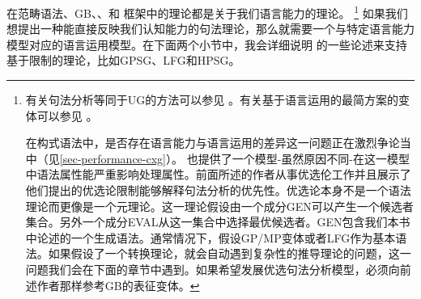 在范畴语法、GB\indexgbc、\lfgc、\gpsgc 和 \hpsgc 框架中的理论都是关于我们语言能力的理论。 \footnote{%
有关句法分析等同于UG的方法可以参见 。有关基于语言运用的最简方案的变体可以参见 。

在构式语法\indexcxgc 中，是否存在语言能力与语言运用的差异这一问题正在激烈争论当中（见\ref{sec-performance-cxg}）。 \citet*{FSCK99a}也提供了一个模型-虽然原因不同-在这一模型中语法属性能严重影响处理属性。前面所述的作者从事优选伦工作并且展示了他们提出的优选论限制能够解释句法分析的优先性。优选论\indexotc 本身不是一个语法理论而更像是一个元理论。这一理论假设由一个成分GEN可以产生一个候选者集合。另外一个成分EVAL从这一集合中选择最优候选者。GEN包含我们本书中论述的一个生成语法。通常情况下，假设GP/MP变体\indexgbc  或者LFG\indexlfgc 作为基本语法。如果假设了一个转换理论，就会自动遇到复杂性的推导理论的问题，这一问题我们会在下面的章节中遇到。如果希望发展优选句法分析模型，必须向前述作者那样参考GB的表征变体。
}
如果我们想提出一种能直接反映我们认知能力的句法理论，那么就需要一个与特定语言能力模型对应的语言运用模型。在下面两个小节中，我会详细说明 \citet{SW2011a}的一些论述来支持基于限制的理论，比如GPSG、LFG和HPSG。


